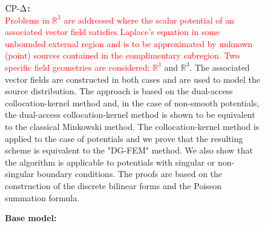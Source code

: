 \begin{figure}[!htbp]
\begin{mdframed}
    \vspace{10pt}
    \begin{minipage}[t]{\textwidth}
        \textbf{$\text{CP-}\Delta$:} \\
\textcolor{red}{Problems in $\mathbb{R}^3$ are addressed where the scalar potential of an associated vector field satisfies Laplace's equation in some unbounded external region and is to be approximated by unknown (point) sources contained in the complimentary subregion. Two specific field geometries are considered: $\mathbb{R}^3$} and $\mathbb{R}^3$. The associated vector fields are constructed in both cases and are used to model the source distribution. The approach is based on the dual-access collocation-kernel method and, in the case of non-smooth potentials, the dual-access collocation-kernel method is shown to be equivalent to the classical Minkowski method. The collocation-kernel method is applied to the case of potentials and we prove that the resulting scheme is equivalent to the "DG-FEM" method. We also show that the algorithm is applicable to potentials with singular or non-singular boundary conditions. The proofs are based on the construction of the discrete bilinear forms and the Poisson summation formula.
    \end{minipage}
    \begin{minipage}[t]{\textwidth}
        \textbf{Base model:} \\

\end{minipage}
\end{mdframed}
\end{figure}
